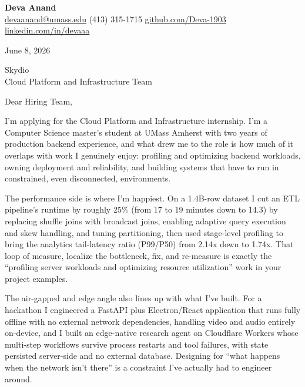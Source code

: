 \documentclass[letterpaper,11pt]{article}
\begin{document}
\begin{center}
  {\LARGE \bfseries \textcolor{ResumeNavy}{Deva Anand}} \\[3pt]
  {\small
  \href{mailto:devaanand@umass.edu}{devaanand@umass.edu} \enspace\textbar\enspace
  (413) 315-1715 \enspace\textbar\enspace
  \href{https://github.com/Deva-1903}{github.com/Deva-1903} \enspace\textbar\enspace
  \href{https://linkedin.com/in/devaaa/}{linkedin.com/in/devaaa}}
\end{center}
\vspace{6pt}

June 8, 2026

\vspace{2pt}
Skydio \\
Cloud Platform and Infrastructure Team

\vspace{6pt}
Dear Hiring Team,

I'm applying for the Cloud Platform and Infrastructure internship. I'm a Computer Science master's student at UMass Amherst with two years of production backend experience, and what drew me to the role is how much of it overlaps with work I genuinely enjoy: profiling and optimizing backend workloads, owning deployment and reliability, and building systems that have to run in constrained, even disconnected, environments.

The performance side is where I'm happiest. On a 1.4B-row dataset I cut an ETL pipeline's runtime by roughly 25\% (from 17 to 19 minutes down to 14.3) by replacing shuffle joins with broadcast joins, enabling adaptive query execution and skew handling, and tuning partitioning, then used stage-level profiling to bring the analytics tail-latency ratio (P99/P50) from 2.14x down to 1.74x. That loop of measure, localize the bottleneck, fix, and re-measure is exactly the ``profiling server workloads and optimizing resource utilization'' work in your project examples.

The air-gapped and edge angle also lines up with what I've built. For a hackathon I engineered a FastAPI plus Electron/React application that runs fully offline with no external network dependencies, handling video and audio entirely on-device, and I built an edge-native research agent on Cloudflare Workers whose multi-step workflows survive process restarts and tool failures, with state persisted server-side and no external database. Designing for ``what happens when the network isn't there'' is a constraint I've actually had to engineer around.
\end{document}
